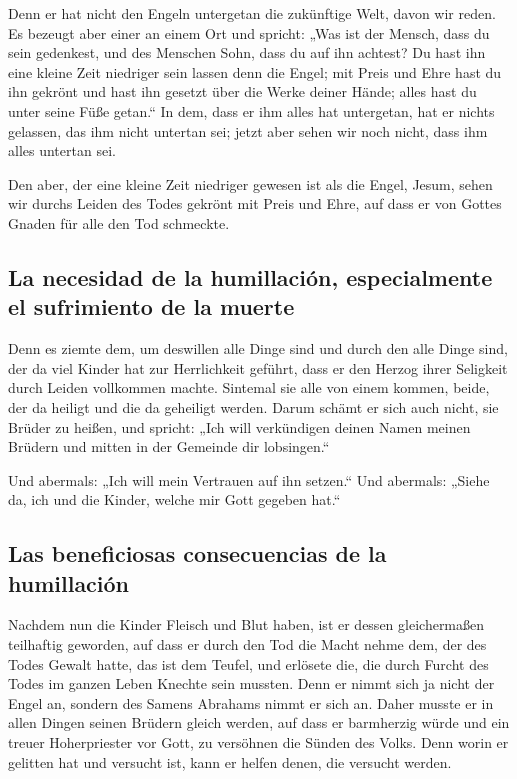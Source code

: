  Denn er hat nicht den Engeln untergetan die zukünftige
Welt, davon wir reden.  Es bezeugt aber einer an einem Ort
und spricht: „Was ist der Mensch, dass du sein gedenkest, und des
Menschen Sohn, dass du auf ihn achtest?  Du hast ihn eine
kleine Zeit niedriger sein lassen denn die Engel; mit Preis und Ehre
hast du ihn gekrönt und hast ihn gesetzt über die Werke deiner Hände;
 alles hast du unter seine Füße getan.`` In dem, dass er
ihm alles hat untergetan, hat er nichts gelassen, das ihm nicht untertan
sei; jetzt aber sehen wir noch nicht, dass ihm alles untertan sei.

 Den aber, der eine kleine Zeit niedriger gewesen ist als
die Engel, Jesum, sehen wir durchs Leiden des Todes gekrönt mit Preis
und Ehre, auf dass er von Gottes Gnaden für alle den Tod schmeckte.

\hypertarget{la-necesidad-de-la-humillaciuxf3n-especialmente-el-sufrimiento-de-la-muerte}{%
\subsection{La necesidad de la humillación, especialmente el sufrimiento
de la
muerte}\label{la-necesidad-de-la-humillaciuxf3n-especialmente-el-sufrimiento-de-la-muerte}}

 Denn es ziemte dem, um deswillen alle Dinge sind und
durch den alle Dinge sind, der da viel Kinder hat zur Herrlichkeit
geführt, dass er den Herzog ihrer Seligkeit durch Leiden vollkommen
machte.  Sintemal sie alle von einem kommen, beide, der
da heiligt und die da geheiligt werden. Darum schämt er sich auch nicht,
sie Brüder zu heißen,  und spricht: „Ich will verkündigen
deinen Namen meinen Brüdern und mitten in der Gemeinde dir lobsingen.``

 Und abermals: „Ich will mein Vertrauen auf ihn setzen.``
Und abermals: „Siehe da, ich und die Kinder, welche mir Gott gegeben
hat.``

\hypertarget{las-beneficiosas-consecuencias-de-la-humillaciuxf3n}{%
\subsection{Las beneficiosas consecuencias de la
humillación}\label{las-beneficiosas-consecuencias-de-la-humillaciuxf3n}}

 Nachdem nun die Kinder Fleisch und Blut haben, ist er
dessen gleichermaßen teilhaftig geworden, auf dass er durch den Tod die
Macht nehme dem, der des Todes Gewalt hatte, das ist dem Teufel,
 und erlösete die, die durch Furcht des Todes im ganzen
Leben Knechte sein mussten.  Denn er nimmt sich ja nicht
der Engel an, sondern des Samens Abrahams nimmt er sich an.
 Daher musste er in allen Dingen seinen Brüdern gleich
werden, auf dass er barmherzig würde und ein treuer Hoherpriester vor
Gott, zu versöhnen die Sünden des Volks.  Denn worin er
gelitten hat und versucht ist, kann er helfen denen, die versucht
werden.

